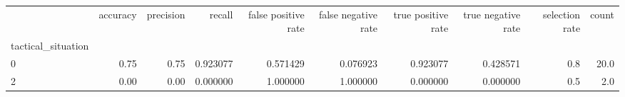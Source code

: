 \begin{tabular}{lrrrrrrrrr}
\toprule
{} &  accuracy &  precision &    recall &  false positive rate &  false negative rate &  true positive rate &  true negative rate &  selection rate &  count \\
tactical\_situation &           &            &           &                      &                      &                     &                     &                 &        \\
\midrule
0                  &      0.75 &       0.75 &  0.923077 &             0.571429 &             0.076923 &            0.923077 &            0.428571 &             0.8 &   20.0 \\
2                  &      0.00 &       0.00 &  0.000000 &             1.000000 &             1.000000 &            0.000000 &            0.000000 &             0.5 &    2.0 \\
\bottomrule
\end{tabular}
